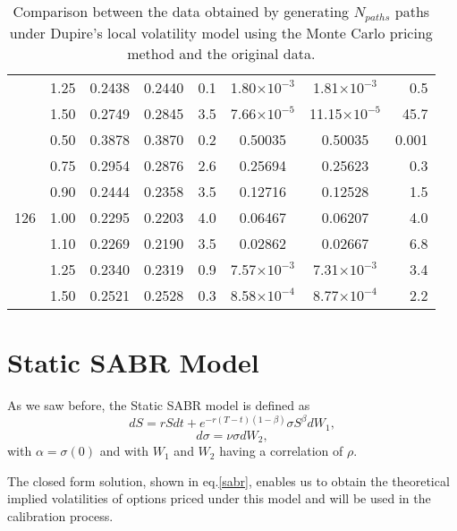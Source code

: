 \begin{table}[H]
\begin{tabular}{@{}lccccccr@{}}
 & 1.25 & 0.2438 & 0.2440 & 0.1 & 1.80$\times10^{-3}$ & 1.81$\times10^{-3}$ & 0.5 \\
 & 1.50 & 0.2749 & 0.2845 & 3.5 & 7.66$\times10^{-5}$ & 11.15$\times10^{-5}$ & 45.7 \\\midrule
\multirow{7}{*}{126} & 0.50 & 0.3878 & 0.3870 & 0.2 & 0.50035 & 0.50035 & 0.001 \\
 & 0.75 & 0.2954 & 0.2876 & 2.6 & 0.25694 & 0.25623 & 0.3 \\
 & 0.90 & 0.2444 & 0.2358 & 3.5 & 0.12716 & 0.12528 & 1.5 \\
 & 1.00 & 0.2295 & 0.2203 & 4.0 & 0.06467 & 0.06207 & 4.0 \\
 & 1.10 & 0.2269 & 0.2190 & 3.5 & 0.02862 & 0.02667 & 6.8 \\
 & 1.25 & 0.2340 & 0.2319 & 0.9 & 7.57$\times10^{-3}$ & 7.31$\times10^{-3}$ & 3.4 \\
 & 1.50 & 0.2521 & 0.2528 & 0.3 & 8.58$\times10^{-4}$ & 8.77$\times10^{-4}$ & 2.2 \\
 \bottomrule
\end{tabular}
  \caption[Comparison between the data obtained by generating $N_{paths}$ paths under Dupire's local volatility model using the Monte Carlo pricing method and the original data.]{Comparison between the data obtained by generating $N_{paths}$ paths under Dupire's local volatility model using the Monte Carlo pricing method and the original data.}
  \label{tab:Dup}
\end{table}










\newpage
\section{Static SABR Model}
As we saw before, the Static SABR model is defined as
\begin{equation}
dS=rSdt+e^{-r(T-t)(1-\beta)}\sigma S^\beta dW_1,
\end{equation}
\begin{equation}
d\sigma=\nu\sigma dW_2,
\end{equation}
\noindent with $\alpha=\sigma(0)$ and with $W_1$ and $W_2$ having a correlation of $\rho$.

The closed form solution, shown in eq.\eqref{sabr}, enables us to obtain the theoretical implied volatilities of options priced under this model and will be used in the calibration process.

